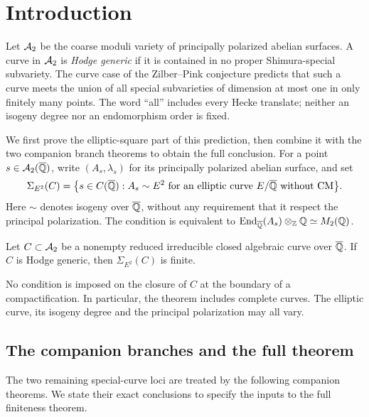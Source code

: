 \section{Introduction}\label{intro:section}

Let $\mathcal A_2$ be the coarse moduli variety of principally polarized abelian
surfaces. A curve in $\mathcal A_2$ is \emph{Hodge generic} if it is contained in no
proper Shimura-special subvariety. The curve case of the Zilber--Pink
conjecture predicts that such a curve meets the union of all special
subvarieties of dimension at most one in only finitely many points.
The word ``all'' includes every Hecke translate; neither an isogeny degree
nor an endomorphism order is fixed.

We first prove the elliptic-square part of this prediction, then combine
it with the two companion branch theorems to obtain the full conclusion.
For a point $s\in\mathcal A_2(\overline{\mathbb Q})$, write $(A_s,\lambda_s)$ for its principally
polarized abelian surface, and set
\[
 \Sigma_{E^2}(C)=
 \bigl\{s\in C(\overline{\mathbb Q}): A_s\sim E^2
       \text{ for an elliptic curve }E/\overline{\mathbb Q}\text{ without CM}\bigr\}.
\]
Here $\sim$ denotes isogeny over $\overline{\mathbb Q}$, without any requirement that it
respect the principal polarization. The condition is equivalent to
$\operatorname{End}_{\overline{\mathbb Q}}(A_s)\otimes_{\mathbb Z}\mathbb Q\simeq M_2(\mathbb Q)$.

\begin{theorem}\label{intro:squares}
Let $C\subset\mathcal A_2$ be a nonempty reduced irreducible closed algebraic
curve over $\overline{\mathbb Q}$. If $C$ is Hodge generic, then $\Sigma_{E^2}(C)$ is
finite.
\end{theorem}

No condition is imposed on the closure of $C$ at the boundary of a
compactification. In particular, the theorem includes complete curves.
The elliptic curve, its isogeny degree and the principal polarization may
all vary.

\subsection{The companion branches and the full theorem}

The two remaining special-curve loci are treated by the following
companion theorems. We state their exact conclusions to specify the
inputs to the full finiteness theorem.

